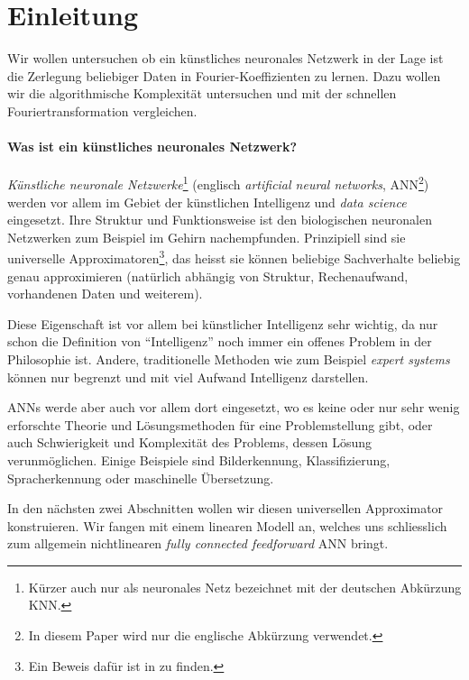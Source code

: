 %
%
%
%
\section{Einleitung\label{ml:einleitung}}

Wir wollen untersuchen ob ein künstliches neuronales Netzwerk in der Lage ist die Zerlegung beliebiger
Daten in Fourier-Koeffizienten zu lernen. Dazu wollen wir die algorithmische
Komplexität untersuchen und mit der schnellen Fouriertransformation vergleichen.

\paragraph{Was ist ein künstliches neuronales Netzwerk?} \emph{Künstliche neuronale
Netzwerke}\footnote{Kürzer auch nur als neuronales Netz bezeichnet mit der deutschen
Abkürzung KNN.} (englisch \emph{artificial neural networks}, ANN\footnote{In diesem Paper
wird nur die englische Abkürzung verwendet.}) werden vor allem im Gebiet der künstlichen
Intelligenz und \emph{data science} eingesetzt. Ihre Struktur und Funktionsweise ist den
biologischen neuronalen Netzwerken zum Beispiel im Gehirn nachempfunden. Prinzipiell sind
sie universelle Approximatoren\footnote{Ein Beweis dafür ist in
\cite{ml:universala-approximator-theorem} zu finden.}, das heisst sie können beliebige
Sachverhalte beliebig genau approximieren (natürlich abhängig von Struktur, Rechenaufwand,
vorhandenen Daten und weiterem).

Diese Eigenschaft ist vor allem bei künstlicher Intelligenz sehr wichtig,
da nur schon die Definition von ``Intelligenz'' noch immer ein offenes Problem in der
Philosophie ist. Andere, traditionelle Methoden wie zum Beispiel \emph{expert systems} können
nur begrenzt und mit viel Aufwand Intelligenz darstellen.

ANNs werde aber auch vor allem dort eingesetzt, wo es keine oder nur sehr wenig erforschte
Theorie und Lösungsmethoden für eine Problemstellung gibt, oder auch Schwierigkeit und
Komplexität des Problems, dessen Lösung verunmöglichen. Einige Beispiele sind
Bilderkennung, Klassifizierung, Spracherkennung oder maschinelle Übersetzung.

\medskip
In den nächsten zwei Abschnitten wollen wir diesen universellen Approximator konstruieren.
Wir fangen mit einem linearen Modell an, welches uns schliesslich zum allgemein
nichtlinearen \emph{fully connected feedforward} ANN bringt.
